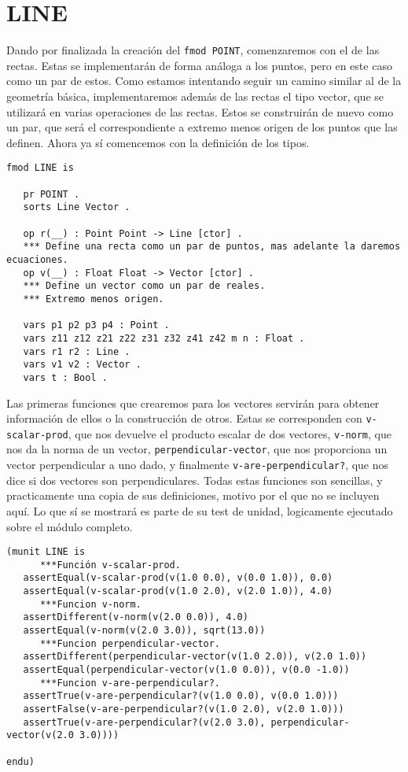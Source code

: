 \section{LINE}

Dando por finalizada la creación del \texttt{fmod POINT}, comenzaremos con el de las rectas. Estas se implementarán de forma análoga a los puntos, pero en este caso como un par de estos. Como estamos intentando seguir un camino similar al de la geometría básica, implementaremos además de las rectas el tipo vector, que se utilizará en varias operaciones de las rectas. Estos se construirán de nuevo como un par, que será el correspondiente a extremo menos origen de los puntos que las definen. Ahora ya sí comencemos con la definición de los tipos.\par 

{\codesize
\begin{verbatim}
fmod LINE is 

   pr POINT .
   sorts Line Vector .

   op r(__) : Point Point -> Line [ctor] .
   *** Define una recta como un par de puntos, mas adelante la daremos ecuaciones.
   op v(__) : Float Float -> Vector [ctor] .
   *** Define un vector como un par de reales.
   *** Extremo menos origen.

   vars p1 p2 p3 p4 : Point .
   vars z11 z12 z21 z22 z31 z32 z41 z42 m n : Float .
   vars r1 r2 : Line .
   vars v1 v2 : Vector .
   vars t : Bool .
\end{verbatim}
}

Las primeras funciones que crearemos para los vectores servirán para obtener información de ellos o la construcción de otros. Estas se corresponden con \texttt{v-scalar-prod}, que nos devuelve el producto escalar de dos vectores, \texttt{v-norm}, que nos da la norma de un vector, \texttt{perpendicular-vector}, que nos proporciona un vector perpendicular a uno dado, y finalmente \texttt{v-are-perpendicular?}, que nos dice si dos vectores son perpendiculares. Todas estas funciones son sencillas, y practicamente una copia de sus definiciones, motivo por el que no se incluyen aquí. Lo que sí se mostrará es parte de su test de unidad, logicamente ejecutado sobre el módulo completo.\par

{\codesize
\begin{verbatim}
(munit LINE is
      ***Función v-scalar-prod.
   assertEqual(v-scalar-prod(v(1.0 0.0), v(0.0 1.0)), 0.0)
   assertEqual(v-scalar-prod(v(1.0 2.0), v(2.0 1.0)), 4.0)	
      ***Funcion v-norm.
   assertDifferent(v-norm(v(2.0 0.0)), 4.0)
   assertEqual(v-norm(v(2.0 3.0)), sqrt(13.0))
      ***Funcion perpendicular-vector.
   assertDifferent(perpendicular-vector(v(1.0 2.0)), v(2.0 1.0))
   assertEqual(perpendicular-vector(v(1.0 0.0)), v(0.0 -1.0))
      ***Funcion v-are-perpendicular?.
   assertTrue(v-are-perpendicular?(v(1.0 0.0), v(0.0 1.0)))
   assertFalse(v-are-perpendicular?(v(1.0 2.0), v(2.0 1.0)))
   assertTrue(v-are-perpendicular?(v(2.0 3.0), perpendicular-vector(v(2.0 3.0))))

endu)
\end{verbatim}
}

